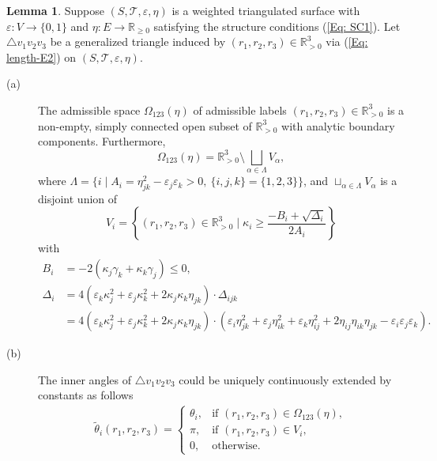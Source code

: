 \documentclass[12pt]{amsart}
\theoremstyle{definition}
\newtheorem{lemma}[theorem]{Lemma}
\begin{document}
\begin{lemma}\label{Lem: basic 2}
Suppose $(S,\mathcal{T},\varepsilon,\eta)$ is a weighted triangulated surface with $\varepsilon: V\rightarrow \{0,1\}$ and $\eta: E\rightarrow \mathbb{R}_{\geq 0}$ satisfying the structure conditions (\ref{Eq: SC1}).
Let $\triangle v_1v_2v_3$ be a generalized triangle induced by $(r_1,r_2,r_3)\in\mathbb{R}^3_{>0}$ via (\ref{Eq: length-E2}) on $(S,\mathcal{T},\varepsilon,\eta)$.
\begin{description}
\item[(a)]
The admissible space $\Omega_{123}(\eta)$ of admissible labels $(r_1, r_2, r_3) \in \mathbb{R}^3_{>0}$ is a non-empty, simply connected open subset of $\mathbb{R}^3_{>0}$ with analytic boundary components.
Furthermore,
\begin{equation*}
\Omega_{123}(\eta)=\mathbb{R}^3_{>0}\setminus \bigsqcup_{\alpha \in \Lambda} V_\alpha,
\end{equation*}
where $\Lambda=\{i \mid A_i=\eta^2_{jk}-\varepsilon_j \varepsilon_k>0, \ \{i,j,k\}=\{1,2,3\}\}$,
and $\sqcup_{\alpha \in \Lambda} V_\alpha$ is a disjoint union of
\begin{equation*}
V_i = \left\{(r_1, r_2, r_3) \in \mathbb{R}^3_{>0} \mid \kappa_i \geq \frac{-B_i + \sqrt{\Delta_i}}{2A_i}\right\}
\end{equation*}
with
\begin{equation*}
\begin{aligned}				B_i&=-2(\kappa_j\gamma_{k}+\kappa_{k}\gamma_j)\leq0,\\
\Delta_i&=4(\varepsilon_k\kappa_j^2
+\varepsilon_j\kappa_{k}^2+2\kappa_j\kappa_{k}\eta_{jk})
\cdot\Delta_{ijk}\\
&=4(\varepsilon_k\kappa_j^2
+\varepsilon_j\kappa_{k}^2+2\kappa_j\kappa_{k}\eta_{jk})\cdot (\varepsilon_i\eta_{jk}^2+\varepsilon_j\eta_{ik}^2
+\varepsilon_k\eta_{ij}^2+2\eta_{ij}\eta_{ik}\eta_{jk}
-\varepsilon_i\varepsilon_j\varepsilon_k).
\end{aligned}
\end{equation*}

\item[(b)]
The inner angles of $\triangle v_1v_2v_3$ could be uniquely continuously extended by constants as follows
\begin{equation*}
\begin{aligned}
\tilde{\theta}_i(r_1, r_2, r_3) = \left\{
\begin{array}{ll}
\theta_i, & \text{if } (r_1, r_2, r_3) \in \Omega_{123}(\eta), \\
\pi, & \text{if } (r_1, r_2, r_3) \in V_i, \\
0, & \text{otherwise}.
\end{array}
\right.
\end{aligned}
\end{equation*}


\end{description}
\end{lemma}
\end{document}

